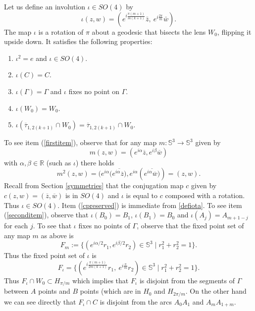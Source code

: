 \documentclass[11pt, reqno]{amsart}
\numberwithin{equation}{section}
\begin{document}
Let us define an involution $\iota\in SO(4)$ by
\begin{equation}\label{defiota}
\iota(z, w) = \left( e^{i \frac{\pi(m+1)}{m(k+1)}} \bar{z}, \ e^{i \frac{2\pi}{m}} \bar{w} \right).
\end{equation}
The map $\iota$ is a rotation of $\pi$ about a geodesic that bisects the lens $W_0$, flipping it upside down. It satisfies the following properties:
\begin{enumerate}
\item $\iota^2=e$ and $\iota\in SO(4)$. \label{firstitem}
\item $\iota(C) = C$.\label{cpreserved}
\item $\iota(\Gamma)=\Gamma$ and $\iota$ fixes no point on $\Gamma$.\label{seconditem}
\item $\iota(W_0)=W_0$. \label{thirditem}
\item $\iota(\overline{\tau}_{1,2(k+1)}\cap W_0)=\overline{\tau}_{1,2(k+1)}\cap W_0$.\label{fourthitem}
\end{enumerate}
To see item (\ref{firstitem}), observe that for any map $m:\mathbb{S}^3\to\mathbb{S}^3$ given by \begin{equation}m(z,w)=(e^{i\alpha}\overline{z},e^{i\beta}\overline{w})\end{equation} with $\alpha, \beta\in\mathbb{R}$ (such as $\iota$) there holds
\begin{equation}
m^2(z,w) = (e^{i\alpha}(\overline{e^{i\alpha}\overline{z})},e^{i\alpha}(\overline{e^{i\alpha}\overline{w})}) = (z,w).
\end{equation}
Recall from Section \ref{symmetries} that the conjugation map $c$ given by $c(z,w)=(\overline{z},\overline{w})$ is in $SO(4)$ and $\iota$ is equal to $c$ composed with a rotation.  Thus $\iota\in SO(4)$.
Item (\ref{cpreserved}) is immediate from \eqref{defiota}.  To see item (\ref{seconditem}), observe that $\iota(B_0)=B_1$, $\iota(B_1)=B_0$ and $\iota(A_j)=A_{m+1-j}$ for each $j$.  To see that $\iota$ fixes no points of $\Gamma$, observe that the fixed point set of any map $m$ as above is \begin{equation}F_m:=\{(e^{i\alpha/2}r_1,e^{i\beta/2}r_2)\in\mathbb{S}^3\;|\; r_1^2+r_2^2=1\}.\end{equation}  Thus the fixed point set of $\iota$ is 
\begin{equation}
F_{\iota}=\{(e^{i \frac{\pi(m+1)}{2m(k+1)}} r_1, \ e^{i \frac{\pi}{m}} r_2)\in\mathbb{S}^3 \;|\; r_1^2+r^2_2=1\}.
\end{equation}
Thus $F_\iota\cap W_0\subset H_{\pi/m}$ which implies that $F_\iota$ is disjoint from the segments of $\Gamma$ between $A$ points and $B$ points (which are in $H_0$ and $H_{2\pi/m}$.  On the other hand we can see directly that $F_\iota\cap C$ is disjoint from the arcs $A_0A_1$ and $A_mA_{1+m}$.
\end{document}
